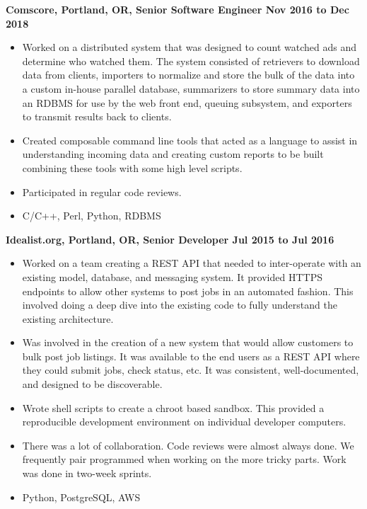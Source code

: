 \documentclass{res}
\begin{document}
\begin{resume}
  {\large \bf Comscore, Portland, OR, Senior Software Engineer \hfill Nov 2016 to Dec 2018}
  \begin{itemize}

  \item
    Worked on a distributed system that was designed to count watched ads
    and determine who watched them.  The system consisted of retrievers to
    download data from clients, importers to normalize and store the bulk
    of the data into a custom in-house parallel database, summarizers
    to store summary data into an RDBMS for use by the web front end,
    queuing subsystem, and exporters to transmit results back to clients.

  \item
    Created composable command line tools that acted as a language to
    assist in understanding incoming data and creating custom reports to
    be built combining these tools with some high level scripts.

  \item
    Participated in regular code reviews.
\item
 \enlargethispage{\baselineskip}
C/C++, Perl, Python, RDBMS

  \end{itemize}

  {\large \bf Idealist.org, Portland, OR, Senior Developer \hfill Jul 2015 to Jul 2016}
  \begin{itemize}
    \item
    Worked on a team creating a REST API that needed
    to inter-operate with an existing model, database, and messaging
    system. It provided HTTPS endpoints to allow other systems to post
    jobs in an automated fashion.  This involved doing
    a deep dive into the existing code to fully understand the existing
    architecture.
    \item
    Was involved in the creation of a new system that would allow
    customers to bulk post job listings.  It was available to the end users
    as a REST API where they could submit jobs, check status, etc.
    It was consistent, well-documented, and designed to be discoverable.
    \item
    Wrote shell scripts to create a chroot based sandbox.  This provided
    a reproducible development environment on individual developer
    computers.
    \item
    There was a lot of collaboration.  Code reviews were almost always
    done.  We frequently pair programmed when working on the
    more tricky parts.  Work was done in two-week sprints.
    \item
    Python, PostgreSQL, AWS
  \end{itemize}


\end{resume}
\end{document}
